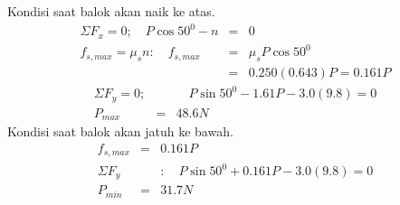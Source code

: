 \begin{solution}
Kondisi saat balok akan naik ke atas. \\
\begin{eqnarray*}
\Sigma F_{x}=0 ;\quad P\cos 50^{0}-n&=&0 \\
f_{s,max}=\mu_{s}n: \quad f_{s,max}&=&\mu_{s} P \cos 50^{0} \\
&=& 0.250(0.643)P=0.161P
\end{eqnarray*}
\begin{eqnarray*}
\Sigma F_{y}=0;& &\quad P\sin 50^{0}-1.61P-3.0(9.8)=0 \\
P_{max}&=&48.6 N
\end{eqnarray*}
Kondisi saat balok akan jatuh ke bawah. \\
\begin{eqnarray*}
f_{s,max}&=&0.161P  \\
\Sigma F_{y}& &:\quad P\sin50^{0}+0.161P-3.0(9.8)=0 \\
P_{min}&=&31.7 N
\end{eqnarray*} 
\end{solution}
